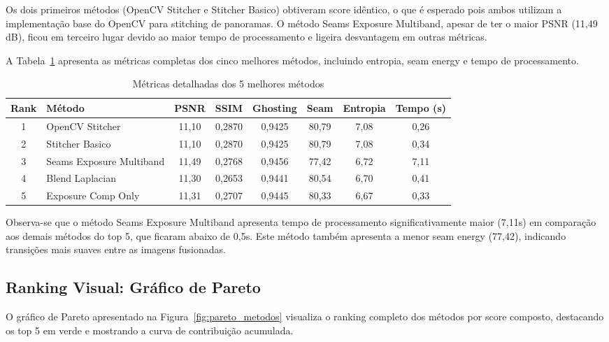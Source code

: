 Os dois primeiros métodos (OpenCV Stitcher e Stitcher Basico) obtiveram score idêntico, o que é esperado pois ambos utilizam a implementação base do OpenCV para stitching de panoramas. O método Seams Exposure Multiband, apesar de ter o maior PSNR (11,49 dB), ficou em terceiro lugar devido ao maior tempo de processamento e ligeira desvantagem em outras métricas.

A Tabela~\ref{tab:top5-detalhado} apresenta as métricas completas dos cinco melhores métodos, incluindo entropia, seam energy e tempo de processamento.

\begin{table}[htb]
\centering
\caption{Métricas detalhadas dos 5 melhores métodos}
\label{tab:top5-detalhado}
\tiny
\begin{tabular}{clcccccc}
\hline
\textbf{Rank} & \textbf{Método} & \textbf{PSNR} & \textbf{SSIM} & \textbf{Ghosting} & \textbf{Seam} & \textbf{Entropia} & \textbf{Tempo (s)} \\ \hline
1 & OpenCV Stitcher & 11,10 & 0,2870 & 0,9425 & 80,79 & 7,08 & 0,26 \\
2 & Stitcher Basico & 11,10 & 0,2870 & 0,9425 & 80,79 & 7,08 & 0,34 \\
3 & Seams Exposure Multiband & 11,49 & 0,2768 & 0,9456 & 77,42 & 6,72 & 7,11 \\
4 & Blend Laplacian & 11,30 & 0,2653 & 0,9441 & 80,54 & 6,70 & 0,41 \\
5 & Exposure Comp Only & 11,31 & 0,2707 & 0,9445 & 80,33 & 6,67 & 0,33 \\
\hline
\end{tabular}
\end{table}

Observa-se que o método Seams Exposure Multiband apresenta tempo de processamento significativamente maior (7,11s) em comparação aos demais métodos do top 5, que ficaram abaixo de 0,5s. Este método também apresenta a menor seam energy (77,42), indicando transições mais suaves entre as imagens fusionadas.

\subsection{Ranking Visual: Gráfico de Pareto}

O gráfico de Pareto apresentado na Figura~\ref{fig:pareto_metodos} visualiza o ranking completo dos métodos por score composto, destacando os top 5 em verde e mostrando a curva de contribuição acumulada.

